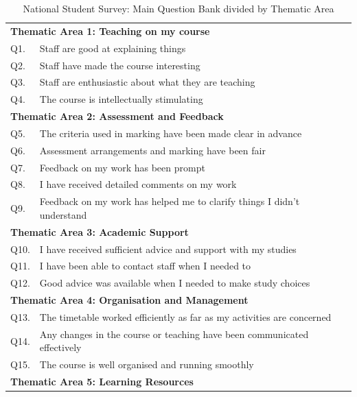\documentclass[11pt,a4paper]{report}
\begin{document}
\begin{table}[p]
	\caption{National Student Survey: Main Question Bank divided by Thematic Area}
	\begin{tabular}{ll} \hline \hline
	\multicolumn{2}{l}{\textbf{Thematic Area 1: Teaching on my course}}  \\[0.1cm]
	Q1. & Staff are good at explaining things \\[0.1cm]
	Q2. &Staff have made the course interesting \\[0.1cm]
	Q3. &Staff are enthusiastic about what they are teaching \\[0.1cm]
	Q4. &The course is intellectually stimulating\\[0.3cm] 

	\multicolumn{2}{l}{\textbf{Thematic Area 2: Assessment and Feedback}}  \\[0.1cm] 
	Q5. &The criteria used in marking have been made clear in advance \\[0.1cm]
	Q6. &Assessment arrangements and marking have been fair \\[0.1cm]
	Q7. &Feedback on my work has been prompt \\[0.1cm]
	Q8. &I have received detailed comments on my work \\[0.1cm]
	Q9. &Feedback on my work has helped me to clarify things I didn't understand\\[0.3cm] 

	\multicolumn{2}{l}{\textbf{Thematic Area 3: Academic Support}} \\[0.1cm]
	Q10. &I have received sufficient advice and support with my studies \\[0.1cm]
	Q11. &I have been able to contact staff when I needed to  \\[0.1cm]
	Q12. &Good advice was available when I needed to make study choices\\[0.3cm] 

	\multicolumn{2}{l}{\textbf{Thematic Area 4: Organisation and Management}} \\[0.1cm]

	Q13. &The timetable worked efficiently as far as my activities are concerned \\[0.1cm]
	Q14. &Any changes in the course or teaching have been communicated effectively \\[0.1cm]
	Q15. &The course is well organised and running smoothly\\[0.3cm] 

	\multicolumn{2}{l}{\textbf{Thematic Area 5: Learning Resources}} \\[0.1cm]


\end{tabular}
\end{table}
\end{document}

